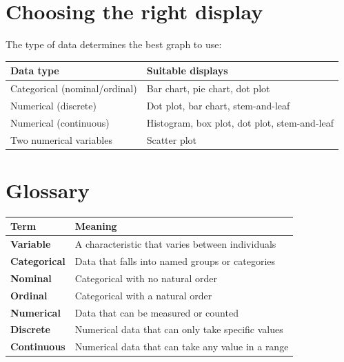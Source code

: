 \documentclass[
  11pt,
  a4paper,
  oneside,
  open=any]{scrbook}
\begin{document}
\section{Choosing the right display}\label{choosing-the-right-display}

The type of data determines the best graph to use:

\begin{longtable}[]{@{}
  >{\raggedright\arraybackslash}p{}
  >{\raggedright\arraybackslash}p{}@{}}
\toprule\noalign{}
\begin{minipage}[b]{\linewidth}\raggedright
Data type
\end{minipage} & \begin{minipage}[b]{\linewidth}\raggedright
Suitable displays
\end{minipage} \\
\midrule\noalign{}
\endhead
\bottomrule\noalign{}
\endlastfoot
Categorical (nominal/ordinal) & Bar chart, pie chart, dot plot \\
Numerical (discrete) & Dot plot, bar chart, stem-and-leaf \\
Numerical (continuous) & Histogram, box plot, dot plot, stem-and-leaf \\
Two numerical variables & Scatter plot \\
\end{longtable}

\section{Glossary}\label{glossary-1}

\begin{longtable}[]{@{}ll@{}}
\toprule\noalign{}
Term & Meaning \\
\midrule\noalign{}
\endhead
\bottomrule\noalign{}
\endlastfoot
\textbf{Variable} & A characteristic that varies between individuals \\
\textbf{Categorical} & Data that falls into named groups or
categories \\
\textbf{Nominal} & Categorical with no natural order \\
\textbf{Ordinal} & Categorical with a natural order \\
\textbf{Numerical} & Data that can be measured or counted \\
\textbf{Discrete} & Numerical data that can only take specific values \\
\textbf{Continuous} & Numerical data that can take any value in a
range \\
\end{longtable}
\end{document}
